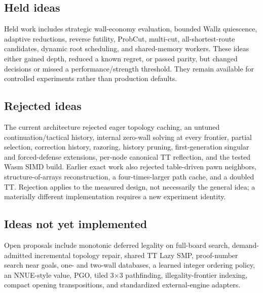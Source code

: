 \subsection{Held ideas}
Held work includes strategic wall-economy evaluation, bounded Wallz quiescence, adaptive reductions, reverse futility, ProbCut, multi-cut, all-shortest-route candidates, dynamic root scheduling, and shared-memory workers. These ideas either gained depth, reduced a known regret, or passed parity, but changed decisions or missed a performance/strength threshold. They remain available for controlled experiments rather than production defaults.

\subsection{Rejected ideas}
The current architecture rejected eager topology caching, an untuned continuation/tactical history, internal zero-wall solving at every frontier, partial selection, correction history, razoring, history pruning, first-generation singular and forced-defense extensions, per-node canonical TT reflection, and the tested Wasm SIMD build. Earlier exact work also rejected table-driven pawn neighbors, structure-of-arrays reconstruction, a four-times-larger path cache, and a doubled TT. Rejection applies to the measured design, not necessarily the general idea; a materially different implementation requires a new experiment identity.

\subsection{Ideas not yet implemented}
Open proposals include monotonic deferred legality on full-board search, demand-admitted incremental topology repair, shared TT Lazy SMP, proof-number search near goals, one- and two-wall databases, a learned integer ordering policy, an NNUE-style value, PGO, tiled 3$\times$3 pathfinding, illegality-frontier indexing, compact opening transpositions, and standardized external-engine adapters.
